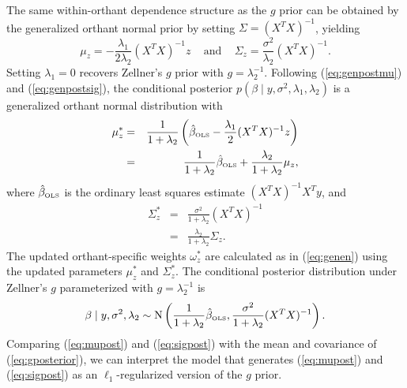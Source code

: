 \documentclass[12pt]{article}
\begin{document}
The same within-orthant dependence structure as the $g$ prior can be obtained by
the generalized orthant normal prior by
setting $\Sigma = (X^T X)^{-1}$, yielding
\begin{equation}
	\mu_z = -\frac{\lambda_1}{2\lambda_2} (X^TX)^{-1}z \;\;\;
	\mbox{ and } \;\;\;
	\Sigma_z = \frac{\sigma^2}{\lambda_2}(X^TX)^{-1}.
	\label{eq:l1g}
\end{equation}
Setting $\lambda_1 = 0$ recovers Zellner's $g$ prior with
$g = \lambda_2^{-1}$.  Following (\ref{eq:genpostmu}) and (\ref{eq:genpostsig}), the 
conditional posterior $p(\beta \mid y, \sigma^2, \lambda_1, \lambda_2)$
is a generalized orthant normal distribution with
\begin{eqnarray}
	\mu_z^* &=& \frac{1}{1+\lambda_2}\left(\hat{\beta}_{\mbox{\tiny OLS}} - \frac{\lambda_1}{2}(X^TX)^{-1} 
		z\right)  \label{eq:mupost} \\
	&=& \frac{1}{1 + \lambda_2}\hat{\beta}_{\mbox{\tiny OLS}} + \frac{\lambda_2}{1+\lambda_2}\mu_z,
		\nonumber
\end{eqnarray}
where $\hat{\beta}_{\mbox{\tiny OLS}}$ is the ordinary least squares estimate $(X^T X)^{-1} X^T y$, and
\begin{eqnarray}
	\Sigma_z^* &=& \frac{\sigma^2}{1+ \lambda_2}(X^TX)^{-1} \label{eq:sigpost} \\
	&=& \frac{\lambda_2}{1+\lambda_2} \Sigma_z.
	\nonumber
\end{eqnarray}
The updated orthant-specific
weights $\omega^*_z$ are calculated as in (\ref{eq:genen}) using the updated parameters
$\mu_z^*$ and $\Sigma_z^*$.
The conditional posterior distribution under Zellner's $g$ parameterized with $g = \lambda_2^{-1}$ 
is
\begin{equation}
	\beta \mid y, \sigma^2, \lambda_2 \sim \mbox{N}\left(
	\frac{1}{1 + \lambda_2}\hat{\beta}_{\mbox{\tiny OLS}}, \frac{\sigma^2}{1+\lambda_2}(X^TX)^{-1}\right).
	\label{eq:gposterior}
\end{equation}
Comparing (\ref{eq:mupost}) and (\ref{eq:sigpost}) with the mean and covariance of (\ref{eq:gposterior}),
we can interpret the model that generates (\ref{eq:mupost}) and (\ref{eq:sigpost}) as an 
$\ell_1$-regularized version of the $g$ prior.
\end{document}
